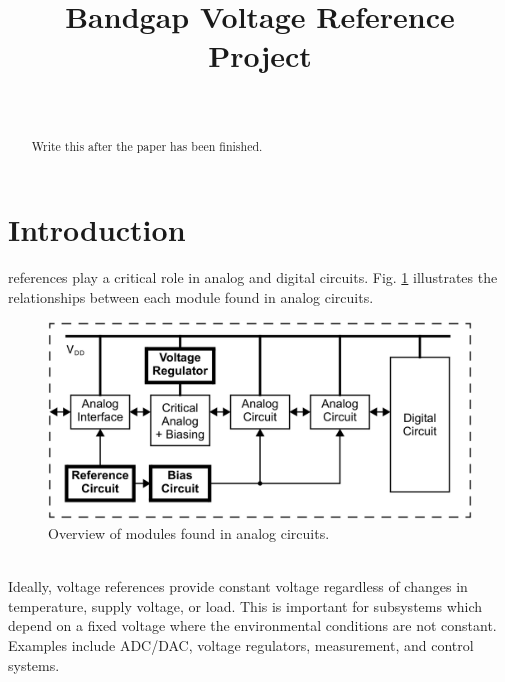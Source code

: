 \documentclass[conference]{IEEEtran}
\begin{document}
%
\title{Bandgap Voltage Reference Project}

\author{
\\
\and
{}
\and
{}
}

\maketitle

\begin{abstract}
Write this after the paper has been finished.
\end{abstract}
\IEEEpeerreviewmaketitle

\section{Introduction}
 references play a critical role in analog and digital circuits.  Fig. \ref{fig:overview} illustrates the relationships between each module found in analog circuits.
\begin{figure}[!htbp]
  \centering
  \includegraphics[scale=0.25]{images/overview.png}
  \caption[Overview]{Overview of modules found in analog circuits.\footnotemark}
  \label{fig:overview}
\end{figure}
\\Ideally, voltage references provide constant voltage regardless of changes in temperature, supply voltage, or load.  This is important for subsystems which depend on a fixed voltage where the environmental conditions are not constant.  Examples include ADC/DAC, voltage regulators, measurement, and control systems.
\end{document}
